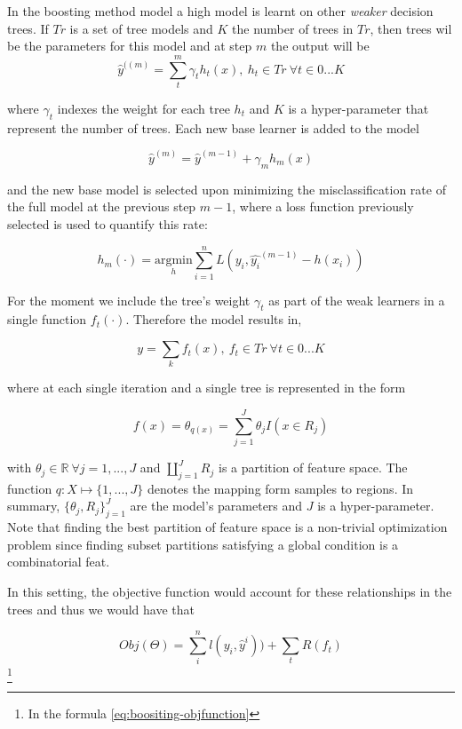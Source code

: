 \documentclass{article}%
\theoremstyle{definition}
\begin{document}
In the boosting method model a high model is learnt on other \textit{weaker} decision trees. If $Tr$ is a set of tree models and $K$ the number of trees in $Tr$, then trees wil be the parameters for this model and at step $m$ the output will be
\[
 \hat{y}^{((m)}=  \sum_t^m \gamma_t h_t(x) , \  h_t \in Tr \ \forall t \in {0...K}
\]

where $\gamma_t$ indexes the weight for each tree $h_t$ and $K$ is a hyper-parameter that represent the number of trees. Each new base learner is added to the model 


\[
 \hat{y}^{(m)} =   \hat{y}^{(m-1)}  + \gamma_m h_m(x) 
\]

and the new base model is selected upon minimizing the misclassification rate of the full model at the previous step $m-1$, where a loss function previously selected is used to quantify this rate:

\[
h_m(\cdot) = \underset{h}{\mathrm{argmin}}   \sum_{i=1}^{n} L ( y_i,  \hat{y_i}^{(m-1)} -  h(x_i)  ) 
\]






 
For the moment  we  include the tree's weight $\gamma_t$ as part of the weak learners in a single function $f_t(\cdot)$. Therefore the model results in,

\[
y =  \sum_k f_t(x) ,  \ f_t \in Tr  \ \forall t \in {0...K}
\]

where at each single iteration
and a single tree is represented in the form 

\[
f(x) = \theta_{q(x)} = \sum_{j=1}^J \theta_j I(x \in  R_j)
\]

with $\theta_j \in \mathbb{R} \ \forall j = 1,...,J$ and $ \coprod_{j=1}^J R_j$ is a partition of feature space. The function $q : X \mapsto \{1,...,J\}$ denotes the mapping form samples to regions. In summary, $\{\theta_j, R_j\}_{j=1}^J$ are the model's parameters and $J$ is a hyper-parameter. Note that finding the best partition of feature space is a non-trivial optimization problem since finding subset partitions satisfying a global condition is a combinatorial feat.

In this setting, the objective function would account for these relationships in the trees and thus we would have that

\[ Obj(\Theta) = \sum_i^n l(y_i,\hat{y}^i))  +  \sum_t R(f_t) \] \label{eq:boositing-objfunction} \footnote{In the formula \ref{eq:boositing-objfunction} }
%    
\end{document}
